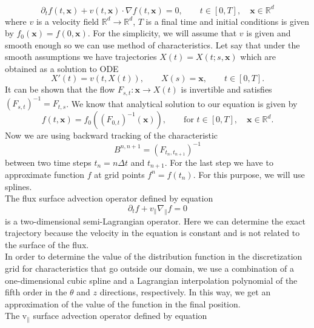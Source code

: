 \begin{equation}
    \partial_t f(t,\mathbf{x})+v(t,\mathbf{x})\cdot \nabla f(t,\mathbf{x})=0, \qquad t\in[0,T], \quad \mathbf{x}\in\mathbb{R}^d
\end{equation}
where $v$ is a velocity field $\mathbb{R}^d\longrightarrow\mathbb{R}^d$, $T$ is a final time and initial conditions is given by $f_0(\mathbf{x})=f(0,\mathbf{x})$. For the simplicity, we will assume that $v$ is given and smooth enough so we can use method of characteristics. Let say that under the smooth assumptions we have trajectories $X(t)=X(t;s,\mathbf{x})$ which are obtained as a solution to ODE
\begin{equation}
    X'(t)=v(t,X(t)), \qquad X(s)=\mathbf{x}, \qquad t\in[0,T].
\end{equation}
It can be shown that the flow $F_{s,t}:\mathbf{x}\longrightarrow X(t)$ is invertible and satisfies $(F_{s,t})^{-1}=F_{t,s}$. We know that analytical solution to our equation is given by
\begin{equation}
    f(t,\mathbf{x})=f_0((F_{0,t})^{-1}(\mathbf{x})),\qquad \text{for } t\in[0,T], \quad \mathbf{x}\in\mathbb{R}^d.
\end{equation}
Now we are using backward tracking of the characteristic
\begin{equation}
    B^{n,n+1}=(F_{t_n,t_{n+1}})^{-1}
\end{equation}
between two time steps $t_n=n\Delta t$ and $t_{n+1}$. For the last step we have to approximate function $f$ at grid points $f^n=f(t_n)$. For this purpose, we will use splines.\\
The flux surface advection operator defined by equation
\begin{equation}
 \partial_t f + v_\parallel \nabla_\parallel f = 0
\end{equation}
is a two-dimensional semi-Lagrangian operator. Here we can determine the exact trajectory because the velocity in the equation is constant and is not related to the surface of the flux.\\
In order to determine the value of the distribution function in the discretization grid for characteristics that go outside our domain, we use a combination of a one-dimensional cubic spline and a Lagrangian interpolation polynomial of the fifth order in the $\theta$ and $z$ directions, respectively. In this way, we get an approximation of the value of the function in the final position.\\
The v$_\parallel$ surface advection operator defined by equation
